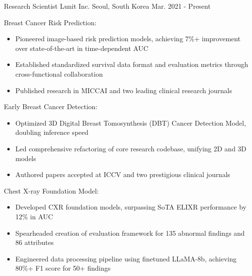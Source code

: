 
\begin{cventries}

  \cventry
    {Research Scientist} %
    {Lunit Inc.} %
    {Seoul, South Korea} %
    {Mar. 2021 - Present} %
    {
      \begin{cvitems} %
        \item {Breast Cancer Risk Prediction:}
          \begin{itemize}
            \item Pioneered image-based risk prediction models, achieving 7\%+ improvement over state-of-the-art in time-dependent AUC
            \item Established standardized survival data format and evaluation metrics through cross-functional collaboration
            \item Published research in MICCAI and two leading clinical research journals
          \end{itemize}
        \item {Early Breast Cancer Detection:}
          \begin{itemize}
            \item Optimized 3D Digital Breast Tomosynthesis (DBT) Cancer Detection Model, doubling inference speed
            \item Led comprehensive refactoring of core research codebase, unifying 2D and 3D models
            \item Authored papers accepted at ICCV and two prestigious clinical journals
          \end{itemize}
        \item {Chest X-ray Foundation Model:}
          \begin{itemize}
            \item Developed CXR foundation models, surpassing SoTA ELIXR performance by 12\% in AUC
            \item Spearheaded creation of evaluation framework for 135 abnormal findings and 86 attributes
            \item Engineered data processing pipeline using finetuned LLaMA-8b, achieving 80\%+ F1 score for 50+ findings
          \end{itemize}
      \end{cvitems}
    }

\end{cventries}